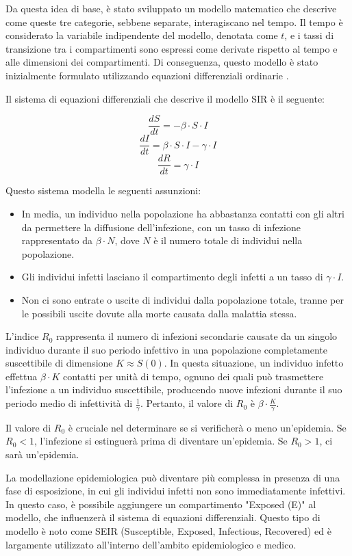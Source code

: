 Da questa idea di base, è stato sviluppato un modello matematico che 
descrive come queste tre categorie, sebbene separate, interagiscano 
nel tempo. Il tempo è considerato la variabile indipendente del modello, 
denotata come $t$, e i tassi di transizione tra i compartimenti sono 
espressi come derivate rispetto al tempo e alle dimensioni dei 
compartimenti. Di conseguenza, questo modello è stato inizialmente 
formulato utilizzando equazioni differenziali ordinarie \cite{Brauer2008}.

Il sistema di equazioni differenziali che descrive il modello SIR è il seguente:

\[ \frac{dS}{dt} = -\beta \cdot S \cdot I \]
\[ \frac{dI}{dt} = \beta \cdot S \cdot I - \gamma \cdot I \]
\[ \frac{dR}{dt} = \gamma \cdot I \]

Questo sistema modella le seguenti assunzioni:

\begin{itemize}
    \item In media, un individuo nella popolazione ha abbastanza contatti 
    con gli altri da permettere la diffusione dell'infezione, con un tasso 
    di infezione rappresentato da $\beta \cdot N$, dove $N$ è il numero 
    totale di individui nella popolazione.
    \item Gli individui infetti lasciano il compartimento degli infetti a 
    un tasso di $\gamma \cdot I$.
    \item Non ci sono entrate o uscite di individui dalla popolazione 
    totale, tranne per le possibili uscite dovute alla morte causata 
    dalla malattia stessa.
\end{itemize}

L'indice $R_0$ rappresenta il numero di infezioni secondarie causate da 
un singolo individuo durante il suo periodo infettivo in una popolazione 
completamente suscettibile di dimensione $K \approx S(0)$. In questa 
situazione, un individuo infetto effettua $\beta \cdot K$ contatti per 
unità di tempo, ognuno dei quali può trasmettere l'infezione a un 
individuo suscettibile, producendo nuove infezioni durante il suo periodo 
medio di infettività di $\frac{1}{\gamma}$. Pertanto, il valore 
di $R_0$ è $\beta \cdot \frac{K}{\gamma}$.

Il valore di $R_0$ è cruciale nel determinare se si verificherà o meno 
un'epidemia. Se $R_0 < 1$, l'infezione si estinguerà prima di diventare 
un'epidemia. Se $R_0 > 1$, ci sarà un'epidemia.

La modellazione epidemiologica può diventare più complessa in presenza 
di una fase di esposizione, in cui gli individui infetti non sono 
immediatamente infettivi. In questo caso, è possibile aggiungere un 
compartimento "Exposed (E)" al modello, che influenzerà il sistema di 
equazioni differenziali. Questo tipo di modello è noto come SEIR 
(Susceptible, Exposed, Infectious, Recovered) ed è largamente
utilizzato all'interno dell'ambito epidemiologico e medico.

